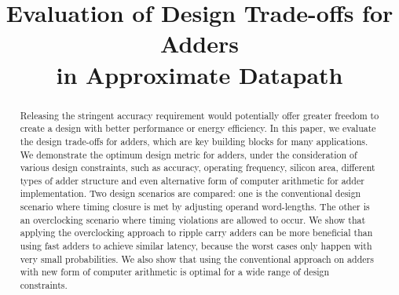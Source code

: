 \documentclass[10pt, conference, compsocconf]{IEEEtran}
\begin{document}
\title{Evaluation of Design Trade-offs for Adders\\ in Approximate Datapath}

\author{
}


\maketitle


\begin{abstract}
Releasing the stringent accuracy requirement would potentially offer greater freedom to create a design with better performance or energy efficiency. In this paper, we evaluate the design trade-offs for adders, which are key building blocks for many applications. We demonstrate the optimum design metric for adders, under the consideration of various design constraints, such as accuracy, operating frequency, silicon area, different types of adder structure and even alternative form of computer arithmetic for adder implementation. Two design scenarios are compared: one is the conventional design scenario where timing closure is met by adjusting operand word-lengths. The other is an overclocking scenario where timing violations are allowed to occur. We show that applying the overclocking approach to ripple carry adders can be more beneficial than using fast adders to achieve similar latency, because the worst cases only happen with very small probabilities. We also show that using the conventional approach on adders with new form of computer arithmetic is optimal for a wide range of design constraints. 



\end{abstract}
\end{document}
